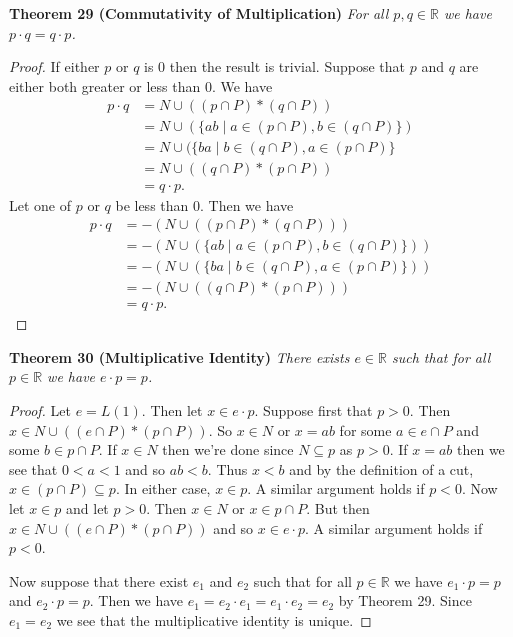 \documentclass{article}
\begin{document}
\begin{flushleft}
\textbf{Theorem 29 (Commutativity of Multiplication)}
\textsl{For all $p,q \in \mathbb{R}$ we have $p \cdot q = q \cdot p$.}
\begin{proof}
If either $p$ or $q$ is $0$ then the result is trivial. Suppose that $p$ and $q$ are either both greater or less than $0$. We have
\begin{align*}
p \cdot q &= N \cup ((p \cap P) * (q \cap P)) \\
		&= N \cup (\{ab \mid a \in (p \cap P), b \in (q \cap P)\}) \\
		&= N \cup (\{ba \mid b \in (q \cap P), a \in (p \cap P)\} \\
		&= N \cup ((q \cap P) * (p \cap P)) \\
		&= q \cdot p.
\end{align*}
Let one of $p$ or $q$ be less than $0$. Then we have
\begin{align*}
p \cdot q &= -(N \cup ((p \cap P) * (q \cap P))) \\
		&= -(N \cup (\{ab \mid a \in (p \cap P), b \in (q \cap P)\})) \\
		&= -(N \cup (\{ba \mid b \in (q \cap P), a \in (p \cap P)\})) \\
		&= -(N \cup ((q \cap P) * (p \cap P))) \\
		&= q \cdot p.
\end{align*}
\end{proof}

\textbf{Theorem 30 (Multiplicative Identity)}
\textsl{There exists $e \in \mathbb{R}$ such that for all $p \in \mathbb{R}$ we have $e \cdot p = p$.}
\begin{proof}
Let $e=L(1)$. Then let $x \in e \cdot p$. Suppose first that $p>0$. Then $x \in N \cup ((e \cap P) * (p \cap P))$. So $x \in N$ or $x = ab$ for some $a \in e \cap P$ and some $b \in p \cap P$. If $x \in N$ then we're done since $N \subseteq p$ as $p>0$. If $x=ab$ then we see that $0<a<1$ and so $ab<b$. Thus $x<b$ and by the definition of a cut, $x \in (p \cap P) \subseteq p$. In either case, $x \in p$. A similar argument holds if $p<0$. Now let $x \in p$ and let $p>0$. Then $x \in N$ or $x \in p \cap P$. But then $x \in N \cup ((e \cap P) * (p \cap P))$ and so $x \in e \cdot p$. A similar argument holds if $p<0$.\newline

Now suppose that there exist $e_1$ and $e_2$ such that for all $p \in \mathbb{R}$ we have $e_1 \cdot p=p$ and $e_2 \cdot p=p$. Then we have $e_1=e_2 \cdot e_1=e_1 \cdot e_2=e_2$ by Theorem 29. Since $e_1=e_2$ we see that the multiplicative identity is unique.
\end{proof}


\end{flushleft}
\end{document}
